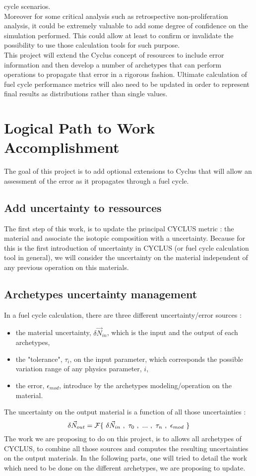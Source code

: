 \documentclass[dvips,12pt]{article}
\begin{document}
cycle scenarios.\\ Moreover for some critical
analysis such as retrospective non-proliferation
analysis, it could be extremely valuable to add
some degree of confidence on the simulation
performed. This could allow at least to confirm or
invalidate the possibility to use those
calculation tools for such purpose.\\ This project
will extend the Cyclus concept of resources to
include error information and then develop a
number of archetypes that can perform operations
to propagate that error in a rigorous fashion.
Ultimate calculation of fuel cycle performance
metrics will also need to be updated in order to
represent final results as distributions rather
than single values.

\section{Logical Path to Work Accomplishment}
The goal of this project is to add optional
extensions to Cyclus that will allow an assessment
of the error as it propagates through a fuel
cycle.

\subsection{Add uncertainty to ressources}
The first step of this work, is to update the
principal CYCLUS metric : the material and
associate the isotopic composition with a
uncertainty. Because for this is the first
introduction of uncertainty in CYCLUS (or fuel
cycle calculation tool in general), we will
consider the uncertainty on the material
independent of any previous operation on this
materials.
\subsection{Archetypes uncertainty management}
In a fuel cycle calculation, there are three
different uncertainty/error sources :
\begin{itemize}
\item the material uncertainty,
  $\delta\vec{N}_{in}$, which is the input and the
  output of each archetypes,
\item the "tolerance", $\tau_{i}$, on the input
  parameter, which corresponds the possible
  variation range of any physics parameter, $i$,
\item the error, $\epsilon_{mod}$, introduce by
  the archetypes modeling/operation on the
  material.
\end{itemize}
The uncertainty on the output material is a
function of all those uncertainties :
\begin{equation}
\delta \vec{N}_{out} = {\cal F}\{~\delta\vec{N}_{in}~,~\tau_0~,~...~,~\tau_n~,~\epsilon_{mod}~\}
\end{equation}
The work we are proposing to do on this project,
is to allows all archetypes of CYCLUS, to combine
all those sources and computes the resulting
uncertainties on the output materials.  In the
following parts, one will tried to detail the work
which need to be done on the different archetypes,
we are proposing to update.
\end{document}
